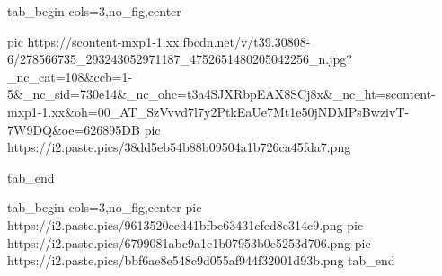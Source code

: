  
 
 
 
 


\ifcmt
  tab_begin cols=3,no_fig,center

     pic https://scontent-mxp1-1.xx.fbcdn.net/v/t39.30808-6/278566735_293243052971187_4752651480205042256_n.jpg?_nc_cat=108&ccb=1-5&_nc_sid=730e14&_nc_ohc=t3a4SJXRbpEAX8SCj8x&_nc_ht=scontent-mxp1-1.xx&oh=00_AT_SzVvvd7l7y2PtkEaUe7Mt1e50jNDMPsBwzivT-7W9DQ&oe=626895DB
		 pic https://i2.paste.pics/38dd5eb54b88b09504a1b726ca45fda7.png

  tab_end
\fi

\ifcmt
  tab_begin cols=3,no_fig,center
		 pic https://i2.paste.pics/9613520eed41bfbe63431cfed8e314c9.png
		 pic https://i2.paste.pics/6799081abc9a1c1b07953b0e5253d706.png
		 pic https://i2.paste.pics/bbf6ae8e548c9d055af944f32001d93b.png
  tab_end
\fi

